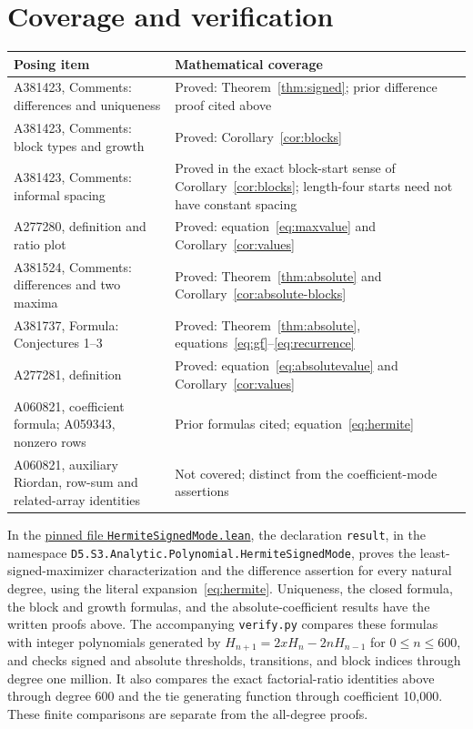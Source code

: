 \documentclass[11pt]{article}
\begin{document}
\section{Coverage and verification}
\begin{center}
\small
\begin{tabular}{@{}>{\raggedright\arraybackslash}p{.42\linewidth}>{\raggedright\arraybackslash}p{.51\linewidth}@{}}
\toprule
Posing item & Mathematical coverage\\
\midrule
A381423, Comments: differences and uniqueness & Proved: Theorem~\ref{thm:signed}; prior difference proof cited above\\
A381423, Comments: block types and growth & Proved: Corollary~\ref{cor:blocks}\\
A381423, Comments: informal spacing & Proved in the exact block-start sense of Corollary~\ref{cor:blocks}; length-four starts need not have constant spacing\\
A277280, definition and ratio plot & Proved: equation~\eqref{eq:maxvalue} and Corollary~\ref{cor:values}\\
A381524, Comments: differences and two maxima & Proved: Theorem~\ref{thm:absolute} and Corollary~\ref{cor:absolute-blocks}\\
A381737, Formula: Conjectures 1--3 & Proved: Theorem~\ref{thm:absolute}, equations~\eqref{eq:gf}--\eqref{eq:recurrence}\\
A277281, definition & Proved: equation~\eqref{eq:absolutevalue} and Corollary~\ref{cor:values}\\
A060821, coefficient formula; A059343, nonzero rows & Prior formulas cited; equation~\eqref{eq:hermite}\\
A060821, auxiliary Riordan, row-sum and related-array identities & Not covered; distinct from the coefficient-mode assertions\\
\bottomrule
\end{tabular}
\end{center}

In the
\href{https://github.com/the-omega-institute/trureturing/blob/a2d277ea0980f1230eff2c7e27838372effccb30/D5/S3/Analytic/Polynomial/HermiteSignedMode.lean}{pinned file \texttt{HermiteSignedMode.lean}},
the declaration \texttt{result}, in the namespace
\texttt{D5.S3.Analytic.Polynomial.}\allowbreak\texttt{HermiteSignedMode},
proves the least-signed-maximizer characterization and the difference
assertion for every natural degree, using the literal expansion~\eqref{eq:hermite}.
Uniqueness, the closed formula, the block and growth formulas, and
the absolute-coefficient results have the written proofs above.
The accompanying \texttt{verify.py} compares these formulas with integer
polynomials generated by $H_{n+1}=2xH_n-2nH_{n-1}$ for $0\leq n\leq600$,
and checks signed and absolute thresholds, transitions, and block indices
through degree one million. It also compares the exact factorial-ratio
identities above through degree 600 and the tie generating function through
coefficient 10,000. These finite comparisons are separate from the all-degree proofs.
\end{document}
